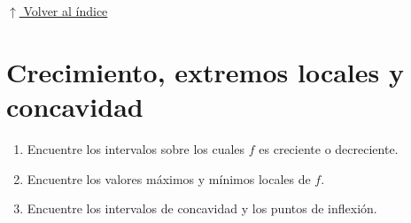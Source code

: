 \documentclass[12pt]{article}
\newcommand{\volverindice}{%
    \vspace{1em}%
    \begin{flushright}%
        \hyperlink{indice}{\small $\uparrow$ Volver al índice}%
    \end{flushright}%
}
\begin{document}
\volverindice
\newpage


\section{Crecimiento, extremos locales y concavidad}

\begin{enumerate}[label=\alph*.-]

    \item Encuentre los intervalos sobre los cuales $f$ es creciente o decreciente.

    \item Encuentre los valores máximos y mínimos locales de $f$.

    \item Encuentre los intervalos de concavidad y los puntos de inflexión.

\end{enumerate}
\end{document}
